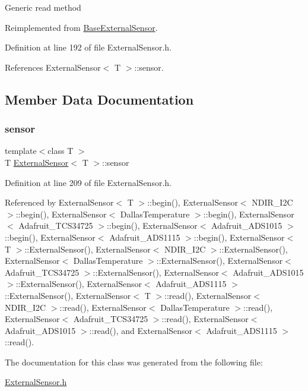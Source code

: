 Generic read method 

Reimplemented from \hyperlink{class_base_external_sensor_a1564f16deacf57b51b9948ac29db4291}{Base\+External\+Sensor}.



Definition at line 192 of file External\+Sensor.\+h.



References External\+Sensor$<$ T $>$\+::sensor.



\subsection{Member Data Documentation}
\mbox{\label{class_external_sensor_a6e1f518119abe08c14b498ce24a7e1b3}} 
\subsubsection{\texorpdfstring{sensor}{sensor}}
{\footnotesize\ttfamily template$<$class T $>$ \\
T \hyperlink{class_external_sensor}{External\+Sensor}$<$ T $>$\+::sensor\hspace{0.3cm}{\ttfamily [private]}}



Definition at line 209 of file External\+Sensor.\+h.



Referenced by External\+Sensor$<$ T $>$\+::begin(), External\+Sensor$<$ N\+D\+I\+R\+\_\+\+I2\+C $>$\+::begin(), External\+Sensor$<$ Dallas\+Temperature $>$\+::begin(), External\+Sensor$<$ Adafruit\+\_\+\+T\+C\+S34725 $>$\+::begin(), External\+Sensor$<$ Adafruit\+\_\+\+A\+D\+S1015 $>$\+::begin(), External\+Sensor$<$ Adafruit\+\_\+\+A\+D\+S1115 $>$\+::begin(), External\+Sensor$<$ T $>$\+::\+External\+Sensor(), External\+Sensor$<$ N\+D\+I\+R\+\_\+\+I2\+C $>$\+::\+External\+Sensor(), External\+Sensor$<$ Dallas\+Temperature $>$\+::\+External\+Sensor(), External\+Sensor$<$ Adafruit\+\_\+\+T\+C\+S34725 $>$\+::\+External\+Sensor(), External\+Sensor$<$ Adafruit\+\_\+\+A\+D\+S1015 $>$\+::\+External\+Sensor(), External\+Sensor$<$ Adafruit\+\_\+\+A\+D\+S1115 $>$\+::\+External\+Sensor(), External\+Sensor$<$ T $>$\+::read(), External\+Sensor$<$ N\+D\+I\+R\+\_\+\+I2\+C $>$\+::read(), External\+Sensor$<$ Dallas\+Temperature $>$\+::read(), External\+Sensor$<$ Adafruit\+\_\+\+T\+C\+S34725 $>$\+::read(), External\+Sensor$<$ Adafruit\+\_\+\+A\+D\+S1015 $>$\+::read(), and External\+Sensor$<$ Adafruit\+\_\+\+A\+D\+S1115 $>$\+::read().



The documentation for this class was generated from the following file\+:\begin{DoxyCompactItemize}
\item 
\hyperlink{_external_sensor_8h}{External\+Sensor.\+h}\end{DoxyCompactItemize}
